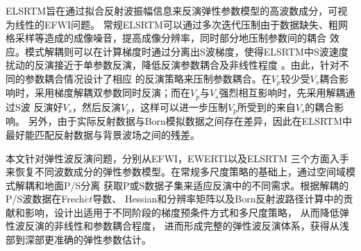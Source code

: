 \begin{cabstract}
	ELSRTM旨在通过拟合反射波振幅信息来反演弹性参数模型的高波数成分，可视为线性的EFWI问题。
	常规ELSRTM可以通过多次迭代压制由于数据缺失、粗网格采样等造成的成像噪音，提高成像分辨率，同时部分地压制参数间的耦合
	效应。模式解耦则可以在计算梯度时通过分离出S波梯度，使得ELSRTM中S波速度扰动的反演接近于单参数反演，降低反演参数耦合及非线性程度
	。由此，针对不同的参数耦合情况设计了相应
	的反演策略来压制参数耦合。在$V_p$较少受$V_s$耦合影响时，采用梯度解耦双参数同时反演；而在$V_p$与$V_s$强烈相互影响时，先采用解耦通过S波
	反演好$V_s$，然后反演$V_p$，这样可以进一步压制$V_p$所受到的来自$V_s$的耦合影响。
	另外，由于实际反射数据与Born模拟数据之间存在差异，因此在ELSRTM中最好能匹配反射数据与背景波场之间的残差。

	本文针对弹性波反演问题，分别从EFWI，EWERTI以及ELSRTM
	三个方面入手来恢复不同波数成分的弹性参数模型。在常规多尺度策略的基础上，通过空间域模式解耦和地面P/S分离
	获取P或S数据子集来适应反演中的不同需求。根据解耦的P/S波数据在Frech$\acute{e}t$导数、
	Hessian和分辨率矩阵以及Born反射波路径计算中的贡献和影响，设计出适用于不同阶段的梯度预条件方式和多尺度策略，
	从而降低弹性波反演的非线性和参数耦合程度，
	进而形成完整的弹性波反演体系，获得从浅部到深部更准确的弹性参数估计。


\end{cabstract}


